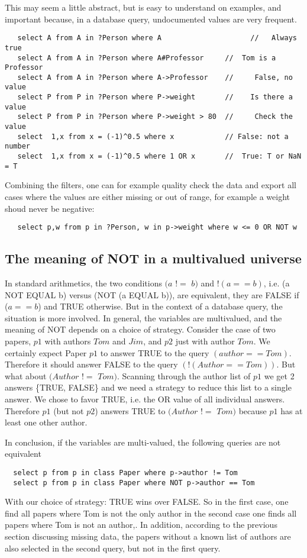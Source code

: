 \documentclass[11pt]{article}
\newcommand{\BL}{\begin{lstlisting}}
\begin{document}
This may seem a little abstract, but is easy to understand on examples, and important
because, in a database query, undocumented values are very frequent.

\BL
   select A from A in ?Person where A                     //   Always true
   select A from A in ?Person where A#Professor     //  Tom is a Professor
   select A from A in ?Person where A->Professor    //     False, no value
   select P from P in ?Person where P->weight       //    Is there a value
   select P from P in ?Person where P->weight > 80  //     Check the value
   select  1,x from x = (-1)^0.5 where x            // False: not a number
   select  1,x from x = (-1)^0.5 where 1 OR x       //  True: T or NaN = T
\end{lstlisting}

Combining the filters, one can for example quality check the data and export all cases
where the values are either missing or out of range, for example a weight shoud never
be negative:
\BL
   select p,w from p in ?Person, w in p->weight where w <= 0 OR NOT w 
\end{lstlisting}

\subsection{The meaning of NOT in a multivalued universe}

In standard arithmetics, the two conditions $(a$ $!$$=$ $b)$ and $! (a == b)$, 
i.e. (a NOT EQUAL b) versus (NOT (a EQUAL b)),
are equivalent, they are FALSE if ($a == b$) and TRUE otherwise. But in
the context of a database query, the situation is more involved.
In general, the variables are multivalued, and the meaning of NOT depends
on a choice of strategy. Consider the case of two
papers, $p1$ with authors $Tom$ and $Jim$, and $p2$ just with author $Tom$.
We certainly expect Paper $p1$ to answer TRUE to the query $(author == Tom)$.
Therefore it should answer FALSE to the query $(! (Author == Tom))$.
But what about $(Author$ $!$$=$ $Tom)$. Scanning through the author list of $p1$
we get 2 answers \{TRUE, FALSE\} and we need a strategy to reduce this list 
to a single answer. We chose to favor TRUE, i.e. the OR value of
all individual answers. Therefore $p1$ (but not $p2$) answers TRUE to 
$(Author$ $!$$=$ $Tom)$
because $p1$ has at least one other author.

In conclusion, if the variables are multi-valued, the following queries are
not equivalent
\BL
  select p from p in class Paper where p->author != Tom
  select p from p in class Paper where NOT p->author == Tom
\end{lstlisting}
With our choice of strategy: TRUE wins over FALSE.
So in the first case, one find all papers where Tom is not the only author
in the second case one finds all papers where Tom is not an author,.
In addition, according to the previous section discussing missing data,
the papers without a known list of authors
are also selected in the second query, but not in the first query.
\end{document}
